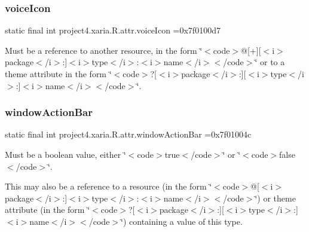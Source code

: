 \subsubsection{\texorpdfstring{voice\+Icon}{voiceIcon}}
{\footnotesize\ttfamily static final int project4.\+xaria.\+R.\+attr.\+voice\+Icon =0x7f0100d7\hspace{0.3cm}{\ttfamily [static]}}

Must be a reference to another resource, in the form \char`\"{}$<$code$>$@\mbox{[}+\mbox{]}\mbox{[}$<$i$>$package$<$/i$>$\+:\mbox{]}$<$i$>$type$<$/i$>$\+:$<$i$>$name$<$/i$>$$<$/code$>$\char`\"{} or to a theme attribute in the form \char`\"{}$<$code$>$?\mbox{[}$<$i$>$package$<$/i$>$\+:\mbox{]}\mbox{[}$<$i$>$type$<$/i$>$\+:\mbox{]}$<$i$>$name$<$/i$>$$<$/code$>$\char`\"{}. \mbox{\label{classproject4_1_1xaria_1_1R_1_1attr_a68f9fac255af3cd5b18a31ccfe66ca09}} 
\subsubsection{\texorpdfstring{window\+Action\+Bar}{windowActionBar}}
{\footnotesize\ttfamily static final int project4.\+xaria.\+R.\+attr.\+window\+Action\+Bar =0x7f01004c\hspace{0.3cm}{\ttfamily [static]}}

Must be a boolean value, either \char`\"{}$<$code$>$true$<$/code$>$\char`\"{} or \char`\"{}$<$code$>$false$<$/code$>$\char`\"{}. 

This may also be a reference to a resource (in the form \char`\"{}$<$code$>$@\mbox{[}$<$i$>$package$<$/i$>$\+:\mbox{]}$<$i$>$type$<$/i$>$\+:$<$i$>$name$<$/i$>$$<$/code$>$\char`\"{}) or theme attribute (in the form \char`\"{}$<$code$>$?\mbox{[}$<$i$>$package$<$/i$>$\+:\mbox{]}\mbox{[}$<$i$>$type$<$/i$>$\+:\mbox{]}$<$i$>$name$<$/i$>$$<$/code$>$\char`\"{}) containing a value of this type. \mbox{\label{classproject4_1_1xaria_1_1R_1_1attr_a15d3726d1218007a750534b444346cfa}} 

